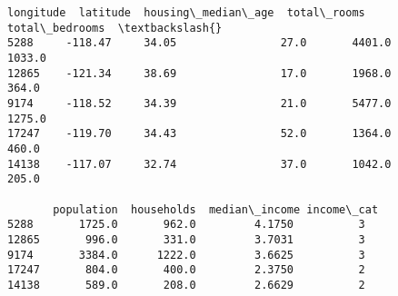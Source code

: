 \documentclass[11pt]{article}
\makeatletter
\newcommand{\boxspacing}{\kern\kvtcb@left@rule\kern\kvtcb@boxsep}
\newcommand{\prompt}[4]{
        \ttfamily\llap{{\color{#2}[#3]:\hspace{3pt}#4}}\vspace{-\baselineskip}
    }
\makeatother
\begin{document}
            \begin{tcolorbox}[breakable, size=fbox, boxrule=.5pt, pad at break*=1mm, opacityfill=0]
\prompt{Out}{outcolor}{74}{\boxspacing}
\begin{Verbatim}[commandchars=\\\{\}]
       longitude  latitude  housing\_median\_age  total\_rooms  total\_bedrooms  \textbackslash{}
5288     -118.47     34.05                27.0       4401.0          1033.0
12865    -121.34     38.69                17.0       1968.0           364.0
9174     -118.52     34.39                21.0       5477.0          1275.0
17247    -119.70     34.43                52.0       1364.0           460.0
14138    -117.07     32.74                37.0       1042.0           205.0

       population  households  median\_income income\_cat
5288       1725.0       962.0         4.1750          3
12865       996.0       331.0         3.7031          3
9174       3384.0      1222.0         3.6625          3
17247       804.0       400.0         2.3750          2
14138       589.0       208.0         2.6629          2
\end{Verbatim}
\end{tcolorbox}
        
\end{document}
